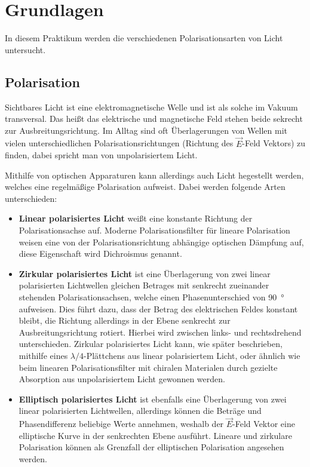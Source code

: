 \chapter{Grundlagen}

In diesem Praktikum werden die verschiedenen Polarisationsarten von Licht untersucht.

\section{Polarisation}

Sichtbares Licht ist eine elektromagnetische Welle und ist als solche im Vakuum transversal.
Das heißt das elektrische und magnetische Feld stehen beide sekrecht zur Ausbreitungsrichtung.
Im Alltag sind oft Überlagerungen von Wellen mit vielen unterschiedlichen Polarisationsrichtungen (Richtung des $\vec{E}$-Feld Vektors) zu finden, dabei spricht man von unpolarisiertem Licht.

Mithilfe von optischen Apparaturen kann allerdings auch Licht hegestellt werden, welches eine regelmäßige Polarisation aufweist.
Dabei werden folgende Arten unterschieden:

\begin{itemize}
	\item \textbf{Linear polarisiertes Licht} weißt eine konstante Richtung der Polarisationsachse auf.
	Moderne Polarisationsfilter für lineare Polarisation weisen eine von der Polarisationsrichtung abhängige optischen Dämpfung auf, diese Eigenschaft wird Dichroismus genannt.
	\item \textbf{Zirkular polarisiertes Licht} ist eine Überlagerung von zwei linear polarisierten Lichtwellen gleichen Betrages mit senkrecht zueinander stehenden Polarisationsachsen, welche einen Phasenunterschied von \SI{90}{\degree} aufweisen.
	Dies führt dazu, dass der Betrag des elektrischen Feldes konstant bleibt, die Richtung allerdings in der Ebene senkrecht zur Ausbreitungsrichtung rotiert.
	Hierbei wird zwischen links- und rechtsdrehend unterschieden.
	Zirkular polarisiertes Licht kann, wie später beschrieben, mithilfe eines $\lambda / 4$-Plättchens aus linear polarisiertem Licht, oder ähnlich wie beim linearen Polarisationsfilter mit chiralen Materialen durch gezielte Absorption aus unpolarisiertem Licht gewonnen werden.
	\item \textbf{Elliptisch polarisiertes Licht} ist ebenfalls eine Überlagerung von zwei linear polarisierten Lichtwellen, allerdings können die Beträge und Phasendifferenz beliebige Werte annehmen, weshalb der $\vec{E}$-Feld Vektor eine elliptische Kurve in der senkrechten Ebene ausführt.
	Lineare und zirkulare Polarisation können als Grenzfall der elliptischen Polarisation angesehen werden.
\end{itemize}